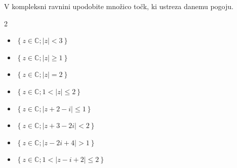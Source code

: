    
            \begin{naloga}
                V kompleksni ravnini upodobite množico točk, ki ustreza danemu pogoju.
                    
                \begin{multicols}{2}
                    
                    \begin{itemize}
                        \item $\left\{z\in\mathbb{C}; \left|z\right|<3 \right\} $ 
                        \item $\left\{z\in\mathbb{C}; \left|z\right|\geq 1 \right\} $ 
                        \item $\left\{z\in\mathbb{C}; \left|z\right|=2 \right\} $ 
                        \item $\left\{z\in\mathbb{C}; 1<\left|z\right| \leq 2 \right\} $ 
                        \item $\left\{z\in\mathbb{C}; \left|z+2-i\right|\leq 1 \right\} $ 
                        \item $\left\{z\in\mathbb{C}; \left|z+3-2i\right|<2 \right\} $ 
                        \item $\left\{z\in\mathbb{C}; \left|z-2i+4\right|>1 \right\} $ 
                        \item $\left\{z\in\mathbb{C}; 1<\left|z-i+2\right| \leq 2 \right\} $ 
                    \end{itemize}
                \end{multicols}
            \end{naloga}


